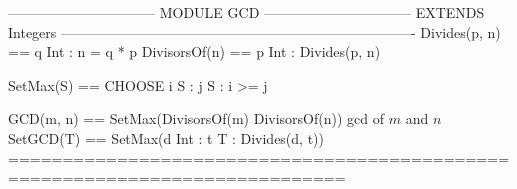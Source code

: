 \documentclass[preview, border={5pt 0pt 5pt 1pt}]{standalone}
\begin{document}
\begin{tla}
-------------------------------- MODULE GCD --------------------------------
EXTENDS Integers
----------------------------------------------------------------------------
Divides(p, n) == \E q \in Int : n = q * p
DivisorsOf(n) == {p \in Int : Divides(p, n)}

SetMax(S) == CHOOSE i \in S : \A j \in S : i >= j

GCD(m, n) == SetMax(DivisorsOf(m) \cap DivisorsOf(n))  \* gcd of $m$ and $n$
SetGCD(T) == SetMax({d \in Int : \A t \in T : Divides(d, t)})
=============================================================================
\end{tla}
\begin{tlatex}
\@x{}\moduleLeftDash{}\moduleRightDash\@xx{}%
%
\@x{}\midbar\@xx{}%
\@pvspace{8.0pt}%
\@pvspace{8.0pt}%
%
\@xx{}%
\@x{}\bottombar\@xx{}%
\end{tlatex}
\end{document}
